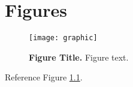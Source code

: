 



\chapter{Figures} \label{figures}

\begin{figure}[hb] \centering
	\texttt{[image: graphic]}
	\caption{\textbf{Figure Title.} Figure text.}
	\label{figure:1}
\end{figure}

Reference Figure \ref{figure:1}.

